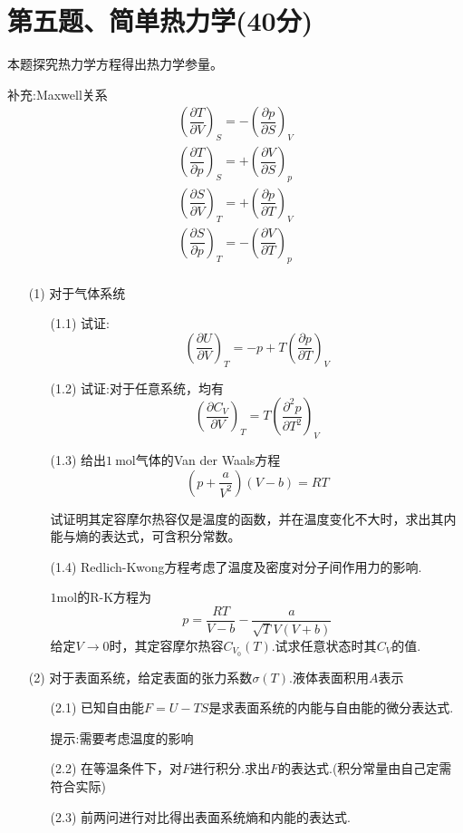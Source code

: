 \documentclass{article}
\begin{document}
\section*{第五题、简单热力学(40分)}
本题探究热力学方程得出热力学参量。\par
补充:Maxwell关系
$$
\begin{aligned}
\left( \dfrac{\partial T}{\partial V}\right) _{S}=-\left( \dfrac{\partial p}{\partial S}\right) _{V}\\
\left( \dfrac{\partial T}{\partial p}\right) _{S}=+\left( \dfrac{\partial V}{\partial S}\right) _{p}\\
\left( \dfrac{\partial S}{\partial V}\right) _{T}=+\left( \dfrac{\partial p}{\partial T}\right) _{V}\\
\left( \dfrac{\partial S}{\partial p}\right) _{T}=-\left( \dfrac{\partial V}{\partial T}\right) _{p}\\
\end{aligned}
$$
\begin{itemize}
    \item[(1)]对于气体系统
    \begin{itemize}
        \item[(1.1)]试证:$$\left(\dfrac{\partial U}{\partial V}\right)_T=-p+T \left(\dfrac{\partial p}{\partial T}\right)_V$$
        \item[(1.2)]试证:对于任意系统，均有$$\left(\dfrac{\partial C_V}{\partial V} \right)_T=T\left(\dfrac{\partial^2 p}{\partial T^2}\right)_V$$
        \item[(1.3)]给出$1\ \mathrm{mol}$气体的Van der Waals方程$$\left(p+\dfrac{a}{V^2}\right)(V-b)=RT$$\par
        试证明其定容摩尔热容仅是温度的函数，并在温度变化不大时，求出其内能与熵的表达式，可含积分常数。
        \item[(1.4)]Redlich-Kwong方程考虑了温度及密度对分子间作用力的影响.\par
        $1\mathrm{mol}$的R-K方程为$$p=\dfrac{RT}{V-b}-\dfrac{a}{\sqrt{T} V(V+b)}$$
        给定$V\to 0$时，其定容摩尔热容$C_{V_0}(T)$.试求任意状态时其$C_V$的值.
    \end{itemize}
    \item[(2)] 对于表面系统，给定表面的张力系数$\sigma(T)$.液体表面积用$A$表示
    \begin{itemize}
        \item[(2.1)] 已知自由能$F=U-TS$是求表面系统的内能与自由能的微分表达式.\par 提示:需要考虑温度的影响
        \item[(2.2)] 在等温条件下，对$F$进行积分.求出$F$的表达式.(积分常量由自己定需符合实际)
        \item[(2.3)] 前两问进行对比得出表面系统熵和内能的表达式.
    \end{itemize}
\end{itemize}
\end{document}
